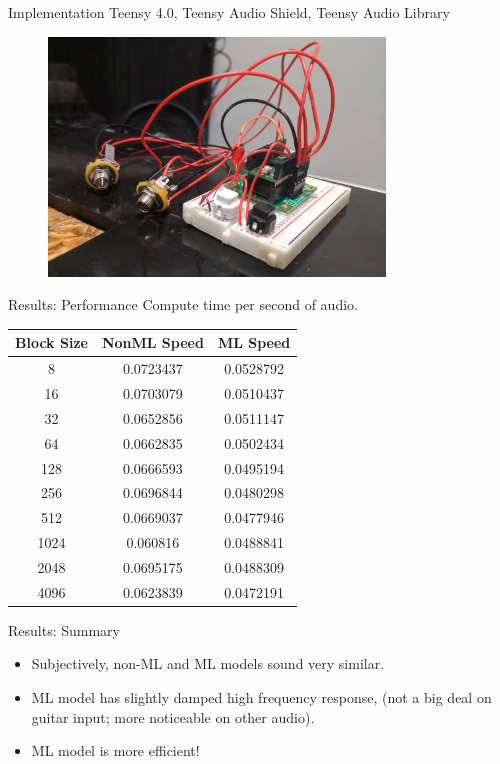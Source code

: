 \begin{frame}{Implementation}
    Teensy 4.0, Teensy Audio Shield, Teensy Audio Library
    \begin{figure}
        \centering
        \includegraphics[height=2.5in]{../Paper/Figures/Teensy.jpg}
    \end{figure}
\end{frame}

\begin{frame}{Results: Performance}
    Compute time per second of audio.
    \begin{table}[h!]
        \centering
         \begin{tabular}{||c | c | c||} 
         \hline
         Block Size & NonML Speed & ML Speed \\
         \hline\hline
         8    & 0.0723437 & 0.0528792 \\
         16   & 0.0703079 & 0.0510437 \\
         32   & 0.0652856 & 0.0511147 \\
         64   & 0.0662835 & 0.0502434 \\
         128  & 0.0666593 & 0.0495194 \\
         256  & 0.0696844 & 0.0480298 \\
         512  & 0.0669037 & 0.0477946 \\
         1024 & 0.060816  & 0.0488841 \\
         2048 & 0.0695175 & 0.0488309 \\
         4096 & 0.0623839 & 0.0472191 \\
         \hline
         \end{tabular}
    \end{table}
\end{frame}

\begin{frame}{Results: Summary}
    \begin{itemize}
        \item Subjectively, non-ML and ML models sound very similar.
        \item ML model has slightly damped high frequency response,
            (not a big deal on guitar input; more noticeable on other audio).
        \item ML model is more efficient!
    \end{itemize}
\end{frame}

